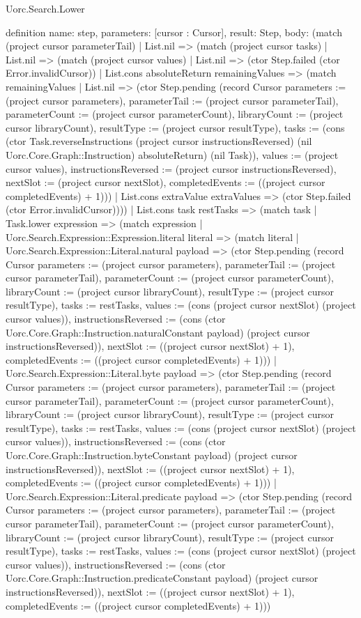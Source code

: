 \begin{lexlean}{Uorc.Search.Lower}
\begin{semanticmodule}
definition{
  name: step,
  parameters: [cursor : Cursor],
  result: Step,
  body: (match (project cursor parameterTail)
    | List.nil => (match (project cursor tasks)
      | List.nil => (match (project cursor values)
        | List.nil => (ctor Step.failed (ctor Error.invalidCursor))
        | List.cons absoluteReturn remainingValues => (match remainingValues
          | List.nil => (ctor Step.pending (record Cursor {parameters := (project cursor parameters), parameterTail := (project cursor parameterTail), parameterCount := (project cursor parameterCount), libraryCount := (project cursor libraryCount), resultType := (project cursor resultType), tasks := (cons (ctor Task.reverseInstructions (project cursor instructionsReversed) (nil Uorc.Core.Graph::Instruction) absoluteReturn) (nil Task)), values := (project cursor values), instructionsReversed := (project cursor instructionsReversed), nextSlot := (project cursor nextSlot), completedEvents := ((project cursor completedEvents) + 1)}))
          | List.cons extraValue extraValues => (ctor Step.failed (ctor Error.invalidCursor))))
      | List.cons task restTasks => (match task
        | Task.lower expression => (match expression
          | Uorc.Search.Expression::Expression.literal literal => (match literal
            | Uorc.Search.Expression::Literal.natural payload => (ctor Step.pending (record Cursor {parameters := (project cursor parameters), parameterTail := (project cursor parameterTail), parameterCount := (project cursor parameterCount), libraryCount := (project cursor libraryCount), resultType := (project cursor resultType), tasks := restTasks, values := (cons (project cursor nextSlot) (project cursor values)), instructionsReversed := (cons (ctor Uorc.Core.Graph::Instruction.naturalConstant payload) (project cursor instructionsReversed)), nextSlot := ((project cursor nextSlot) + 1), completedEvents := ((project cursor completedEvents) + 1)}))
            | Uorc.Search.Expression::Literal.byte payload => (ctor Step.pending (record Cursor {parameters := (project cursor parameters), parameterTail := (project cursor parameterTail), parameterCount := (project cursor parameterCount), libraryCount := (project cursor libraryCount), resultType := (project cursor resultType), tasks := restTasks, values := (cons (project cursor nextSlot) (project cursor values)), instructionsReversed := (cons (ctor Uorc.Core.Graph::Instruction.byteConstant payload) (project cursor instructionsReversed)), nextSlot := ((project cursor nextSlot) + 1), completedEvents := ((project cursor completedEvents) + 1)}))
            | Uorc.Search.Expression::Literal.predicate payload => (ctor Step.pending (record Cursor {parameters := (project cursor parameters), parameterTail := (project cursor parameterTail), parameterCount := (project cursor parameterCount), libraryCount := (project cursor libraryCount), resultType := (project cursor resultType), tasks := restTasks, values := (cons (project cursor nextSlot) (project cursor values)), instructionsReversed := (cons (ctor Uorc.Core.Graph::Instruction.predicateConstant payload) (project cursor instructionsReversed)), nextSlot := ((project cursor nextSlot) + 1), completedEvents := ((project cursor completedEvents) + 1)}))
}
\end{semanticmodule}
\end{lexlean}
